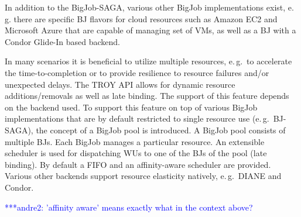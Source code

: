 \documentclass[conference,final]{IEEEtran}
\newcommand{\jhanote}[1]{ {\textcolor{red} { ***shantenu: #1 }}}
\newcommand{\alnote}[1]{ {\textcolor{blue} { ***andre: #1 }}}
\newcommand{\amnote}[1]{ {\textcolor{blue} { ***andre2: #1 }}}
\newcommand{\alnote}[1]{}
\newcommand{\amnote}[1]{}
\newcommand{\jhanote}[1]{}
\begin{document}
In addition to the BigJob-SAGA, various other BigJob
implementations exist, e.\,g. there are specific BJ flavors for cloud
resources such as Amazon EC2 and Microsoft Azure that are capable of
managing set of VMs, as well as a BJ with a Condor Glide-In based
backend. 


In many scenarios it is beneficial to utilize multiple resources, e.\,g.\ to
accelerate the time-to-completion or to provide resilience to resource failures
and/or unexpected delays. The TROY API allows for dynamic resource
additions/removals as well as late binding. The support of this feature depends
on the backend used. To support this feature on top of various BigJob
implementations that are by default restricted to single resource use (e.\,g.\
BJ-SAGA), the concept of a BigJob pool is introduced. A BigJob pool consists of
multiple BJs. Each BigJob manages a particular resource. An extensible
scheduler is used for dispatching WUs to one of the BJs of the pool (late
binding).  By default a FIFO
and an affinity-aware scheduler are provided. Various other backends support
resource elasticity natively, e.\,g.\ DIANE and Condor.

\amnote{'affinity aware' means exactly what in the context above?}



\end{document}
